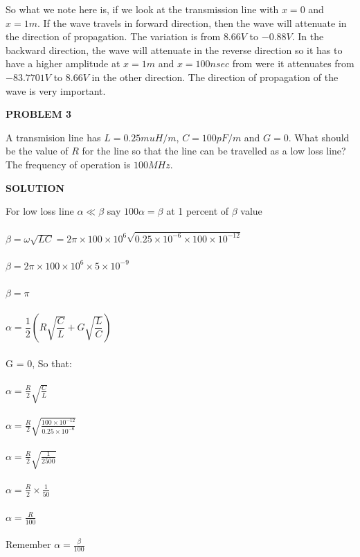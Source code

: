 So what we note here is, if we look at the transmission line with ${x=0}$ and ${x=1m}$. If the wave travels in forward direction, then the wave will attenuate in the direction of propagation. The variation is from ${8.66V}$ to ${-0.88V}$. In the backward direction, the wave will attenuate in the reverse direction so it has to  have a higher amplitude at ${x=1m}$ and ${x=100nsec}$ from were it attenuates from ${-83.7701V}$ to ${8.66V}$ in the other direction. The direction of propagation of the wave is very important.\\
\begin{center}
\textbf{PROBLEM 3}
\end{center}
A transmision line has $L = 0.25muH/m$, $C=100pF/m$ and ${G=0}$. What should be the value of ${R}$ for the line so that the line can be travelled as a low loss line? The frequency of operation is ${100MHz}$.\\
\begin{center}
\textbf{SOLUTION}
\end{center}
For low loss line ${\alpha\ll\beta}$ say ${100\alpha=\beta}$ at 1 percent of ${\beta}$ value\\\\
${\beta=\omega\sqrt{LC}} = {2\pi\times100\times10^6\sqrt{0.25\times10^{-6}\times100\times10^{-12}}}$\\\\
${\beta=2\pi\times100\times10^6\times5\times10^{-9}}$\\\\
${\beta=\pi}$\\\\			${\alpha={\dfrac{1}{2}}(R\sqrt{\dfrac{C}{L}}+G\sqrt{\dfrac{L}{C}})}$\\\\
G = 0, So that:\\\\
${\alpha={\frac{R}{2}}\sqrt{\frac{C}{L}}}$\\\\
${\alpha=\frac{R}{2}\sqrt{\frac{100\times10^{-12}}{0.25\times10^{-6}}}}$\\\\
${\alpha=\frac{R}{2}\sqrt{\frac{1}{2500}}}$\\\\
${\alpha=\frac{R}{2}\times\frac{1}{50}}$\\\\
${\alpha=\frac{R}{100}}$\\\\
Remember 
${\alpha = \frac{\beta}{100}}$\\\\
